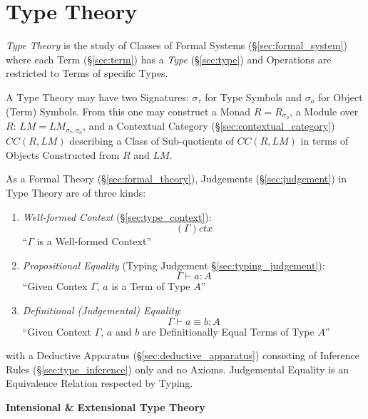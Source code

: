\part{Type Theory}\label{sec:type_theory}

\emph{Type Theory} is the study of Classes of Formal Systems
(\S\ref{sec:formal_system}) where each Term (\S\ref{sec:term}) has a
\emph{Type} (\S\ref{sec:type}) and Operations are restricted to Terms
of specific Types.

A Type Theory may have two Signatures: $\sigma_\tau$ for Type Symbols
and $\sigma_o$ for Object (Term) Symbols. From this one may construct
a Monad $R = R_{\sigma_o}$, a Module over $R$: $LM =
LM_{\sigma_\tau,\sigma_o}$, and a Contextual Category
(\S\ref{sec:contextual_category}) $CC(R,LM)$ describing a Class of
Sub-quotients of $CC(R,LM)$ in terms of Objects Constructed from $R$
and $LM$. \cite{voevedsky14}

As a Formal Theory (\S\ref{sec:formal_theory}), Judgements
(\S\ref{sec:judgement}) in Type Theory are of three
kinds\cite{hott13}:
\begin{enumerate}

\item \emph{Well-formed Context} (\S\ref{sec:type_context}):
  \[
    (\Gamma) ctx
  \]
  ``$\Gamma$ is a Well-formed Context''

\item \emph{Propositional Equality} (Typing Judgement
    \S\ref{sec:typing_judgement}):
  \[
    \Gamma \vdash a : A
  \]
  ``Given Contex $\Gamma$, $a$ is a Term of Type $A$''

\item \emph{Definitional (Judgemental) Equality}:
  \[
    \Gamma \vdash a \equiv b : A
  \]
  ``Given Context $\Gamma$, $a$ and $b$ are Definitionally Equal Terms
  of Type $A$''

\end{enumerate}
with a Deductive Apparatus (\S\ref{sec:deductive_apparatus})
consisting of Inference Rules (\S\ref{sec:type_inference}) only and no
Axioms. Judgemental Equality is an Equivalence Relation respected by
Typing.



\textbf{Intensional \& Extensional Type Theory}

